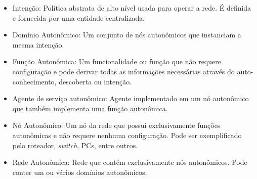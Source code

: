 \begin{itemize}
    \item Intenção: Política abstrata de alto nível usada para operar a rede. É definida e fornecida por uma entidade centralizada.
    \item Domínio Autonômico: Um conjunto de nós autonômicos que instanciam a mesma intenção.
    \item Função Autonômica: Um funcionalidade ou função que não requere configuração e pode derivar todas as informações necessárias através do auto-conhecimento, descoberta ou intenção. 
    \item Agente de serviço autonômico: Agente implementado em um nó autonômico que também implementa uma função autonômica.
    \item Nó Autonômico: Um nó da rede que possui exclusivamente funções autonômicas e não requere nenhuma configuração. Pode ser exemplificado pelo roteador, \emph{switch}, PCs, entre outros.
    \item Rede Autonômica: Rede que contém exclusivamente nós autonômicos. Pode conter um ou vários domínios autonômicos.
\end{itemize}


